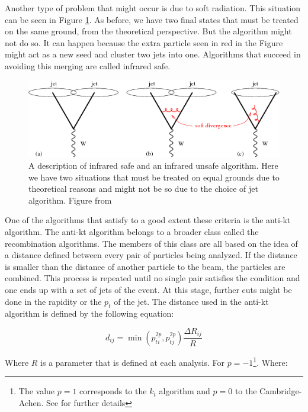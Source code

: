Another type of problem that might occur is due to soft radiation. This situation can be seen in Figure \ref{infrared_safe}. As before, we have two final states that must be treated on the same ground, from the theoretical perspective. But the algorithm might not do so. It can happen because the extra particle seen in red in the Figure might act as a new seed and cluster two jets into one. Algorithms that succeed in avoiding this merging are called infrared safe.

\begin{figure}
\includegraphics[width=1.0\textwidth]{images/infrared_safe.png}
\caption[Collinear safe ilustration]{A description of infrared safe and an infrared unsafe algorithm. Here we have two situations that must be treated on equal grounds due to theoretical reasons and might not be so due to the choice of jet algorithm. Figure from \cite{salam_towards_2010}}
\label{infrared_safe}
\end{figure}

One of the algorithms that satisfy to a good extent these criteria is the anti-kt algorithm\citep{cacciari_fastjet_2012}. The anti-kt algorithm belongs to a broader class called the recombination algorithms. The members of this class are all based on the idea of a distance defined between every pair of particles being analyzed. If the distance is smaller than the distance of another particle to the beam, the particles are combined. This process is repeated until no single pair satisfies the condition and one ends up with a set of jets of the event. At this stage, further cuts might be done in the rapidity or the $p_t$ of the jet. The distance used in the anti-kt algorithm is defined by the following equation:

\begin{equation} \label{jet_alg}
d_{ij} = \min (p_{t i}^{2p},p_{t j}^{2p}) \frac{\Delta R_{ij}}{R}
\end{equation}

Where $R$ is a parameter that is defined at each analysis. For $p=-1$\footnote{The value $p=1$ corresponds to the $k_t$ algorithm and $p=0$ to the Cambridge-Achen. See \cite{salam_towards_2010} for further details}. Where:

